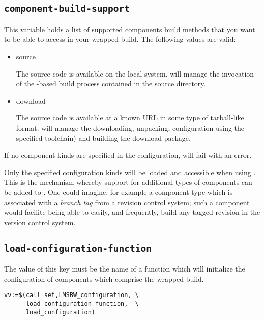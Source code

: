\subsection{\texttt{component-build-support}}\label{aa:component-build-support}

This variable holds a list of supported components build methods that
you want to be able to access in your wrapped build.  The following
values are valid:

\begin{itemize}
\item source

  The source code is available on the local system.  \lmsbw will
  manage the invocation of the \make-based build process contained
  in the source directory.

\item download

  The source code is available at a known URL in some type of
  tarball-like format.  \lmsbw will manage the downloading, unpacking,
  configuration using the specified toolchain) and building the
  download package.
\end{itemize}

If no component kinds are specified in the configuration, \lmsbw will
fail with an error.

Only the specified configuration kinds will be loaded and accessible
when using \lmsbw.  This is the mechanism whereby support for
additional types of components can be added to \lmsbw.  One could
imagine, for example a component type which is associated with a
\emph{branch tag} from a revision control system; such a component
would facilite being able to easily, and frequently, build any tagged
revision in the version control system.

\subsection{\texttt{load-configuration-function}}\label{aa:load-configuration-function}

The value of this key must be the name of a \gnumake function which
will initialize the configuration of components which comprise the
wrapped build.

\begin{verbatim}
vv:=$(call set,LMSBW_configuration, \
      load-configuration-function,  \
      load_configuration)
\end{verbatim}

